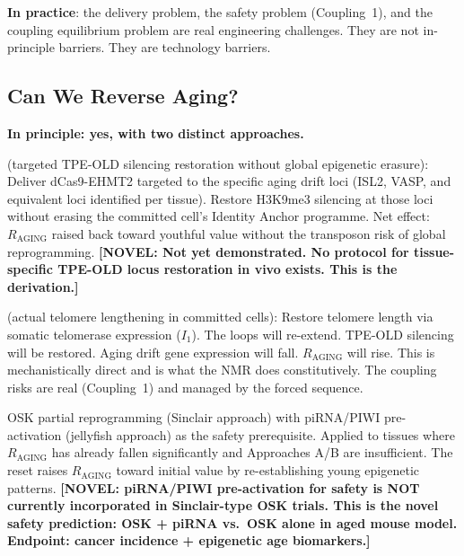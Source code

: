 \documentclass[12pt,a4paper]{article}
\newcommand{\raging}{$R_{\mathrm{AGING}}$}
\newcommand{\tpeold}{TPE-OLD}
\newcommand{\novel}[1]{\textbf{[NOVEL: #1]}}
\newcommand{\Inet}[1]{$I_{#1}$}
\begin{document}
\textbf{In practice}: the delivery problem, the safety problem (Coupling~1),
and the coupling equilibrium problem are real engineering challenges. They are
not in-principle barriers. They are technology barriers.

\subsection{Can We Reverse Aging?}

\textbf{In principle: yes, with two distinct approaches.}

\begin{description}[leftmargin=2em]
  \item[\textbf{Approach A --- Non-Yamanaka reversal}] (targeted \tpeold{}
    silencing restoration without global epigenetic erasure): Deliver dCas9-EHMT2
    targeted to the specific aging drift loci (ISL2, VASP, and equivalent
    loci identified per tissue). Restore H3K9me3 silencing at those loci
    without erasing the committed cell's Identity Anchor programme. Net effect:
    \raging{} raised back toward youthful value without the transposon risk
    of global reprogramming. \novel{Not yet demonstrated. No protocol for
    tissue-specific \tpeold{} locus restoration in vivo exists. This is
    the derivation.}

  \item[\textbf{Approach B --- \tpeold{}-loop restoration}] (actual telomere
    lengthening in committed cells): Restore telomere length via somatic
    telomerase expression (\Inet{1}). The loops will re-extend. \tpeold{}
    silencing will be restored. Aging drift gene expression will fall.
    \raging{} will rise. This is mechanistically direct and is what the NMR
    does constitutively. The coupling risks are real (Coupling~1) and managed
    by the forced sequence.

  \item[\textbf{Approach C --- Partial epigenetic reset} (\Inet{8}):] OSK
    partial reprogramming (Sinclair approach) with piRNA/PIWI pre-activation
    (jellyfish approach) as the safety prerequisite. Applied to tissues where
    \raging{} has already fallen significantly and Approaches A/B are insufficient.
    The reset raises \raging{} toward initial value by re-establishing young
    epigenetic patterns. \novel{piRNA/PIWI pre-activation for safety is NOT
    currently incorporated in Sinclair-type OSK trials. This is the novel
    safety prediction: OSK + piRNA vs.\ OSK alone in aged mouse model.
    Endpoint: cancer incidence + epigenetic age biomarkers.}
\end{description}
\end{document}
